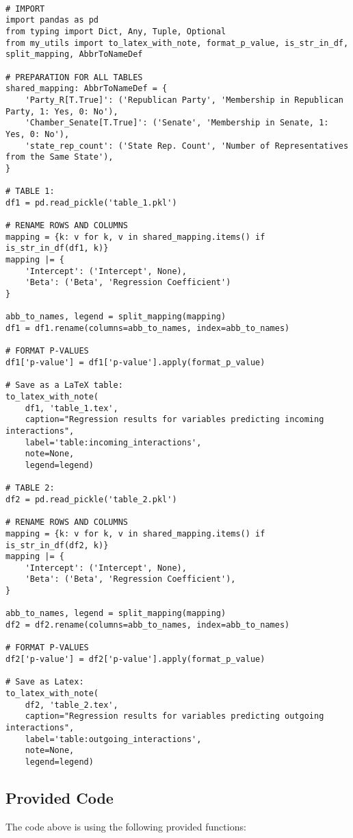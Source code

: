 \documentclass[11pt]{article}
\begin{document}
\begin{verbatim}

# IMPORT
import pandas as pd
from typing import Dict, Any, Tuple, Optional
from my_utils import to_latex_with_note, format_p_value, is_str_in_df, split_mapping, AbbrToNameDef

# PREPARATION FOR ALL TABLES
shared_mapping: AbbrToNameDef = {
    'Party_R[T.True]': ('Republican Party', 'Membership in Republican Party, 1: Yes, 0: No'),
    'Chamber_Senate[T.True]': ('Senate', 'Membership in Senate, 1: Yes, 0: No'),
    'state_rep_count': ('State Rep. Count', 'Number of Representatives from the Same State'),
}

# TABLE 1:
df1 = pd.read_pickle('table_1.pkl')

# RENAME ROWS AND COLUMNS
mapping = {k: v for k, v in shared_mapping.items() if is_str_in_df(df1, k)} 
mapping |= {
    'Intercept': ('Intercept', None),
    'Beta': ('Beta', 'Regression Coefficient')
}

abb_to_names, legend = split_mapping(mapping)
df1 = df1.rename(columns=abb_to_names, index=abb_to_names)

# FORMAT P-VALUES
df1['p-value'] = df1['p-value'].apply(format_p_value)

# Save as a LaTeX table:
to_latex_with_note(
    df1, 'table_1.tex',
    caption="Regression results for variables predicting incoming interactions", 
    label='table:incoming_interactions',
    note=None,
    legend=legend)

# TABLE 2:
df2 = pd.read_pickle('table_2.pkl')

# RENAME ROWS AND COLUMNS
mapping = {k: v for k, v in shared_mapping.items() if is_str_in_df(df2, k)}
mapping |= {
    'Intercept': ('Intercept', None),
    'Beta': ('Beta', 'Regression Coefficient'),
}

abb_to_names, legend = split_mapping(mapping)
df2 = df2.rename(columns=abb_to_names, index=abb_to_names)

# FORMAT P-VALUES
df2['p-value'] = df2['p-value'].apply(format_p_value)

# Save as Latex:
to_latex_with_note(
    df2, 'table_2.tex',
    caption="Regression results for variables predicting outgoing interactions", 
    label='table:outgoing_interactions',
    note=None,
    legend=legend)

\end{verbatim}

\subsection{Provided Code}
The code above is using the following provided functions:
\end{document}
